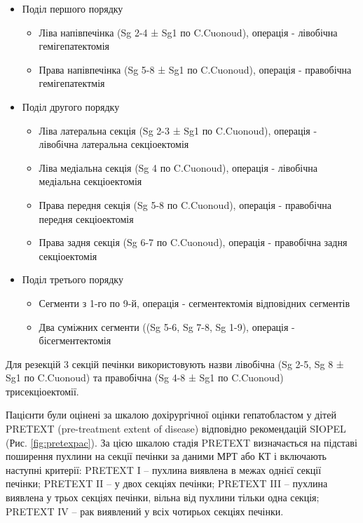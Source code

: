 \begin{itemize}
    \item Поділ першого порядку
    \begin{itemize}
    \item Ліва напівпечінка (Sg 2-4 ± Sg1 по C.Cuonoud), операція - лівобічна гемігепатектомія
    \item Права напівпечінка (Sg 5-8 ± Sg1 по C.Cuonoud), операція - правобічна гемігепатектмія
\end{itemize}
\end{itemize}
\begin{itemize}
    \item Поділ другого порядку
    \begin{itemize}
    \item Ліва латеральна секція (Sg 2-3 ± Sg1 по C.Cuonoud), операція - лівобічна латеральна секціоектомія
    \item Ліва медіальна секція (Sg 4 по C.Cuonoud), операція - лівобічна медіальна секціоектомія
    \item Права передня секція (Sg 5-8 по C.Cuonoud), операція - правобічна передня секціоектомія
    \item Права задня секція (Sg 6-7 по C.Cuonoud), операція - правобічна задня секціоектомія
\end{itemize}
\end{itemize}
    \begin{itemize}
    \item Поділ третього порядку
    \begin{itemize}
    \item Сегменти з 1-го по 9-й, операція - сегментектомія відповідних сегментів
    \item Два суміжних сегменти ((Sg 5-6, Sg 7-8, Sg 1-9), операція - бісегментектомія
\end{itemize}
\end{itemize}

Для резекцій 3 секцій печінки використовують назви лівобічна (Sg 2-5, Sg 8 ± Sg1 по C.Cuonoud) та правобічна  (Sg 4-8 ± Sg1 по C.Cuonoud) трисекціоектомії.

Пацієнти були оцінені за шкалою дохірургічної оцінки  гепатобластом у дітей PRETEXT (pre-treatment extent of disease) відповідно рекомендацій SIOPEL (Рис. \ref{fig:pretexpac}). За цією шкалою стадія PRETEXT визначається на підставі поширення пухлини на секції печінки за даними МРТ або КТ і включають наступні критерії: 
PRETEXT I – пухлина виявлена в межах однієї секції печінки; 
PRETEXT II – у двох секціях печінки; 
PRETEXT III – пухлина виявлена у трьох секціях печінки, вільна від пухлини тільки одна секція; 
PRETEXT IV – рак виявлений у всіх чотирьох секціях печінки. 

